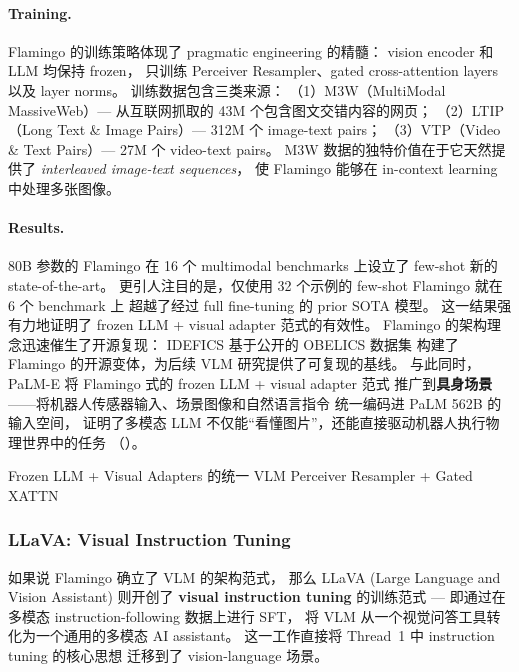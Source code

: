 \paragraph{Training.}
Flamingo 的训练策略体现了 pragmatic engineering 的精髓：
vision encoder 和 LLM 均保持 frozen，
只训练 Perceiver Resampler、gated cross-attention layers 以及 layer norms。
训练数据包含三类来源：
（1）M3W（MultiModal MassiveWeb）--- 从互联网抓取的 43M 个包含图文交错内容的网页；
（2）LTIP（Long Text \& Image Pairs）--- 312M 个 image-text pairs；
（3）VTP（Video \& Text Pairs）--- 27M 个 video-text pairs。
M3W 数据的独特价值在于它天然提供了 \textit{interleaved image-text sequences}，
使 Flamingo 能够在 in-context learning 中处理多张图像。

\paragraph{Results.}
80B 参数的 Flamingo 在 16 个 multimodal benchmarks 上设立了 few-shot 新的 state-of-the-art。
更引人注目的是，仅使用 32 个示例的 few-shot Flamingo 就在 6 个 benchmark 上
超越了经过 full fine-tuning 的 prior SOTA 模型。
这一结果强有力地证明了 frozen LLM + visual adapter 范式的有效性。
Flamingo 的架构理念迅速催生了开源复现：
IDEFICS \cite{laurencon2023idefics} 基于公开的 OBELICS 数据集
构建了 Flamingo 的开源变体，为后续 VLM 研究提供了可复现的基线。
与此同时，PaLM-E \cite{driess2023palme} 将 Flamingo 式的 frozen LLM + visual adapter 范式
推广到\textbf{具身场景}——将机器人传感器输入、场景图像和自然语言指令
统一编码进 PaLM 562B 的输入空间，
证明了多模态 LLM 不仅能``看懂图片''，还能直接驱动机器人执行物理世界中的任务
（）。

  {Frozen LLM + Visual Adapters 的统一 VLM}
  {Perceiver Resampler + Gated XATTN}

\subsubsection{LLaVA: Visual Instruction Tuning}
\label{sec:t5-llava}

如果说 Flamingo 确立了 VLM 的架构范式，
那么 LLaVA (Large Language and Vision Assistant) \cite{liu2023llava} 则开创了
\textbf{visual instruction tuning} 的训练范式 ---
即通过在多模态 instruction-following 数据上进行 SFT，
将 VLM 从一个视觉问答工具转化为一个通用的多模态 AI assistant。
这一工作直接将 Thread~1 中 instruction tuning 的核心思想
迁移到了 vision-language 场景。

